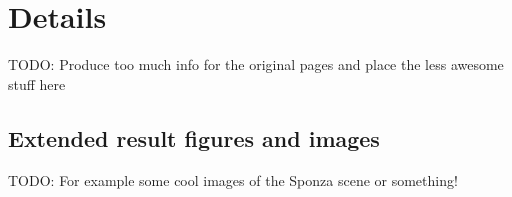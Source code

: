 \chapter{Details}\label{cha:details}

TODO: Produce too much info for the original pages and place the less awesome stuff here

\section{Extended result figures and images}

TODO: For example some cool images of the Sponza scene or something!